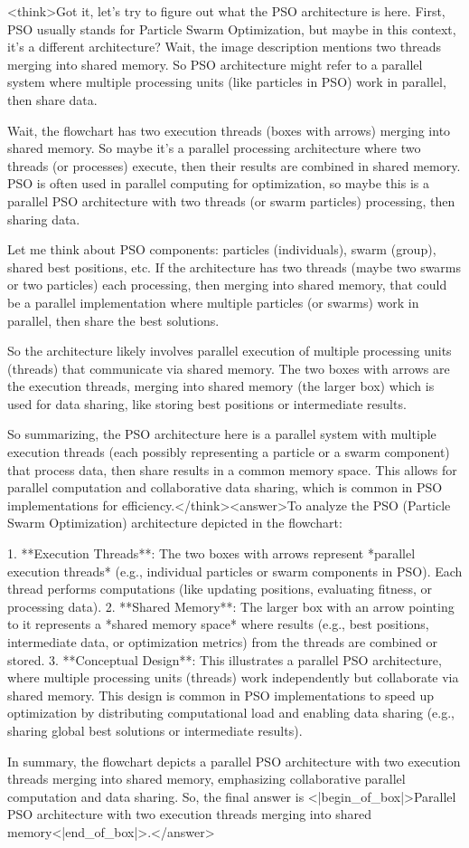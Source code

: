<think>Got it, let's try to figure out what the PSO architecture is here. First, PSO usually stands for Particle Swarm Optimization, but maybe in this context, it's a different architecture? Wait, the image description mentions two threads merging into shared memory. So PSO architecture might refer to a parallel system where multiple processing units (like particles in PSO) work in parallel, then share data. 

Wait, the flowchart has two execution threads (boxes with arrows) merging into shared memory. So maybe it's a parallel processing architecture where two threads (or processes) execute, then their results are combined in shared memory. PSO is often used in parallel computing for optimization, so maybe this is a parallel PSO architecture with two threads (or swarm particles) processing, then sharing data. 

Let me think about PSO components: particles (individuals), swarm (group), shared best positions, etc. If the architecture has two threads (maybe two swarms or two particles) each processing, then merging into shared memory, that could be a parallel implementation where multiple particles (or swarms) work in parallel, then share the best solutions. 

So the architecture likely involves parallel execution of multiple processing units (threads) that communicate via shared memory. The two boxes with arrows are the execution threads, merging into shared memory (the larger box) which is used for data sharing, like storing best positions or intermediate results. 

So summarizing, the PSO architecture here is a parallel system with multiple execution threads (each possibly representing a particle or a swarm component) that process data, then share results in a common memory space. This allows for parallel computation and collaborative data sharing, which is common in PSO implementations for efficiency.</think><answer>To analyze the PSO (Particle Swarm Optimization) architecture depicted in the flowchart:  

1. **Execution Threads**: The two boxes with arrows represent *parallel execution threads* (e.g., individual particles or swarm components in PSO). Each thread performs computations (like updating positions, evaluating fitness, or processing data).  
2. **Shared Memory**: The larger box with an arrow pointing to it represents a *shared memory space* where results (e.g., best positions, intermediate data, or optimization metrics) from the threads are combined or stored.  
3. **Conceptual Design**: This illustrates a parallel PSO architecture, where multiple processing units (threads) work independently but collaborate via shared memory. This design is common in PSO implementations to speed up optimization by distributing computational load and enabling data sharing (e.g., sharing global best solutions or intermediate results).  

In summary, the flowchart depicts a parallel PSO architecture with two execution threads merging into shared memory, emphasizing collaborative parallel computation and data sharing.  
So, the final answer is <|begin_of_box|>Parallel PSO architecture with two execution threads merging into shared memory<|end_of_box|>.</answer>